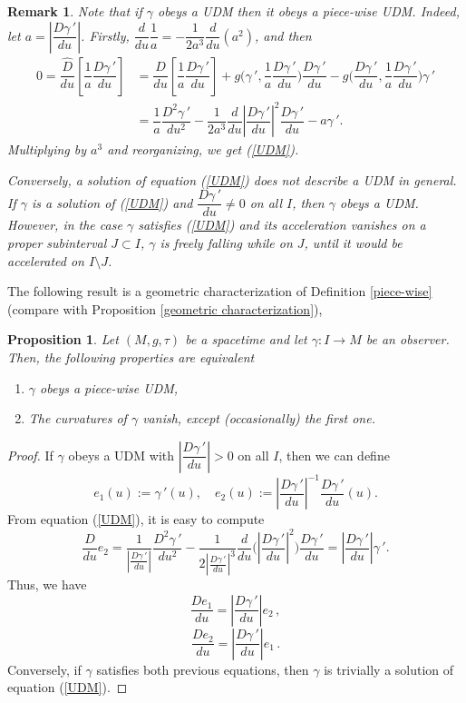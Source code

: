 \documentclass[11pt]{book}
\newtheorem{pro}[defi]{Proposition}
\newtheorem{rem}[defi]{Remark}
\begin{document}
\begin{rem}
	{\rm
		Note that if $\gamma$ obeys a UDM then it obeys a piece-wise UDM. Indeed, let $a=\left|\dfrac{D\gamma{\,'}}{du}\right|$. Firstly, $\dfrac{d}{du}\dfrac{1}{a}=-\dfrac{1}{2a^3}\dfrac{d}{du}(a^2)$, and then
		\begin{align*}
		0=\dfrac{\widehat{D}}{du}\left[ \dfrac{1}{a}\dfrac{D\gamma{\,'}}{du}\right] & =\dfrac{D}{du}\left[\dfrac{1}{a}\dfrac{D\gamma{\,'}}{du}\right]  + g\Big(\gamma{\,'},\dfrac{1}{a}\dfrac{D\gamma{\,'}}{du}\Big)\dfrac{D\gamma{\,'}}{du}-g\Big(\dfrac{D\gamma{\,'}}{du},\dfrac{1}{a}\dfrac{D\gamma{\,'}}{du}\Big)\gamma{\,'} \\[2mm] 
		& =\dfrac{1}{a}\dfrac{D^2\gamma{\,'}}{du^2}-\dfrac{1}{2a^3}\dfrac{d}{du}\left|\dfrac{D\gamma{\,'}}{du}\right|^2\dfrac{D\gamma{\,'}}{du}-a\gamma{\,'}.
		\end{align*}
		Multiplying by $a^3$ and reorganizing, we get {\rm (\ref{UDM})}. 
		
		Conversely, a solution of equation {\rm (\ref{UDM})} does not describe a UDM in general. If $\gamma$ is a solution of {\rm (\ref{UDM})} and $\dfrac{D\gamma{\,'}}{du}\ne 0$ on all $I$, then $\gamma$ obeys a UDM. However, in the case $\gamma$ satisfies {\rm (\ref{UDM})} and its acceleration vanishes on a proper subinterval $J\subset I$, $\gamma$ is freely falling while on $J$, until it would be accelerated on $I\setminus J$. }
\end{rem}

The following result is a geometric characterization of Definition \ref{piece-wise} (compare with Proposition \ref{geometric characterization}),
\begin{pro}
	Let $(M,g,\tau)$ be a spacetime and let $\gamma:I\to M$ be an observer. Then, the following properties are equivalent
	\begin{enumerate}
		\item[(1)] $\gamma$ obeys a piece-wise UDM,
		\item[(2)] The curvatures of $\gamma$ vanish, except (occasionally) the first one.
	\end{enumerate}
\end{pro}
\begin{proof}
	If $\gamma$ obeys a UDM with $\left|\dfrac{D\gamma{\,'}}{du}\right|>0$ on all $I$, then we can define
	\[
	e_1(u):=\gamma{\,'}(u), \quad e_2(u):=\left|\dfrac{D\gamma{\,'}}{du}\right|^{-1}\dfrac{D\gamma{\,'}}{du}(u).
	\]
	From equation (\ref{UDM}), it is easy to compute
	\[
	\frac{D}{du}e_2=\dfrac{1}{\left|\frac{D\gamma{\,'}}{du}\right|}\dfrac{D^2\gamma{\,'}}{du^2}-\dfrac{1}{2\left|\frac{D\gamma{\,'}}{du}\right|^3}\dfrac{d}{du}\Big(\left|\dfrac{D\gamma{\,'}}{du}\right|^2\Big) \dfrac{D\gamma{\,'}}{du}=\left|\dfrac{D\gamma{\,'}}{du}\right| \gamma{\, '}.
	\]
	Thus, we have
	\[
	\dfrac{De_1}{du}=\left|\dfrac{D\gamma{\,'}}{du}\right|e_2\,,
	\]
	\[
	\dfrac{De_2}{du}=\left|\dfrac{D\gamma{\,'}}{du}\right|e_1\,.
	\]
	Conversely, if $\gamma$ satisfies both previous equations, then $\gamma$ is trivially a solution of equation (\ref{UDM}).
\end{proof}
\end{document}
